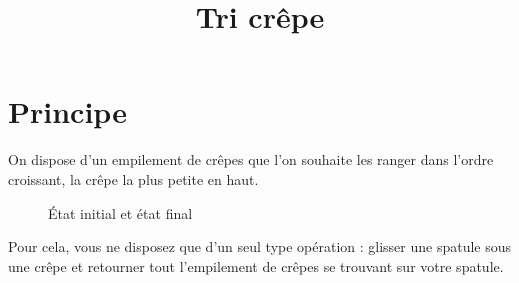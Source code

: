 \documentclass[10pt,]{article}
\title{Tri crêpe}
\date{}
\begin{document}
\maketitle

\hypertarget{principe}{%
\section{Principe}\label{principe}}

On dispose d'un empilement de crêpes que l'on souhaite les ranger dans
l'ordre croissant, la crêpe la plus petite en haut.

\begin{figure}
	\centering
	\caption{État initial et état final}
\end{figure}

Pour cela, vous ne disposez que d'un seul type opération : glisser une
spatule sous une crêpe et retourner tout l'empilement de crêpes se
trouvant sur votre spatule.
\end{document}
